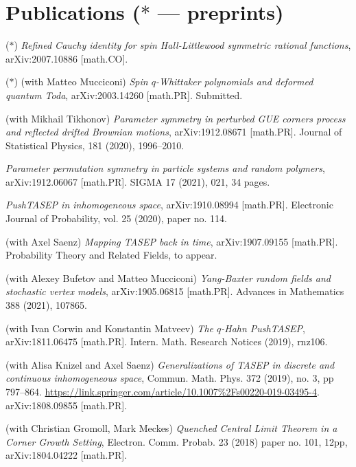 \documentclass[letterpaper,11pt]{article}
\begin{document}
\section*{Publications ($*$ --- preprints)}

\begin{etaremune}
	\renewcommand{\labelenumi}{[\theenumi]}
	\item ($*$)
	\emph{Refined Cauchy identity for spin Hall-Littlewood symmetric rational functions},
		arXiv:2007.10886 [math.CO].
	\item ($*$)
		(with Matteo Mucciconi)
		\emph{Spin $q$-Whittaker polynomials and deformed quantum Toda},
		arXiv:2003.14260 [math.PR]. Submitted.
	\item 
		(with Mikhail Tikhonov)
		\emph{Parameter symmetry in perturbed GUE corners process and reflected drifted Brownian motions},
		arXiv:1912.08671 [math.PR].  Journal of Statistical Physics, 181 (2020), 1996–2010.
	\item
		\emph{Parameter permutation symmetry in particle systems and random polymers},
		arXiv:1912.06067 [math.PR]. SIGMA 17 (2021), 021, 34 pages.
	\item
		\emph{PushTASEP in inhomogeneous space},
		arXiv:1910.08994 [math.PR]. Electronic Journal of Probability, vol. 25 (2020), paper no. 114.
	\item 
		(with Axel Saenz)
		\emph{Mapping TASEP back in time},
		arXiv:1907.09155 [math.PR]. Probability Theory and Related Fields, to appear.
\item 
	(with Alexey Bufetov and Matteo Mucciconi)
	\emph{Yang-Baxter random fields and stochastic vertex models},
	arXiv:1905.06815 [math.PR].
	Advances in Mathematics 388 (2021), 107865.
\item 
	(with Ivan Corwin and Konstantin Matveev)
	\emph{The $q$-Hahn PushTASEP},
	arXiv:1811.06475 [math.PR].
	Intern. Math. Research Notices (2019), rnz106.
\item 
	(with Alisa Knizel and
		Axel Saenz)
		\emph{Generalizations of TASEP in discrete and continuous inhomogeneous space}, 
		Commun. Math. Phys. 
		372 (2019), no. 3, pp 797–864.
		\url{https://link.springer.com/article/10.1007%2Fs00220-019-03495-4}.
		arXiv:1808.09855 [math.PR].
\item (with Christian Gromoll, Mark Meckes)
		\emph{Quenched Central Limit Theorem in a Corner Growth Setting},
		Electron. Comm. Probab. 23 (2018) paper no. 101, 12pp,
		arXiv:1804.04222 [math.PR].
		

\end{etaremune}
\end{document}
